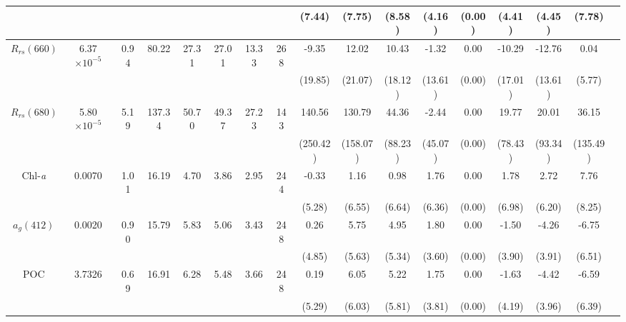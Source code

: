 \documentclass[preview]{standalone}
\begin{document}
\begin{tabular}{ccccccccccccccccc}
 				&						&		&			&			&			&			&			&   (7.44) 	&  (7.75) 	&  (8.58) 	&  (4.16) 	& (0.00) 	&  (4.41) 	&   (4.45) 	&   (7.78) 	\\ \hline   
$R_{rs}(660)$ 	& 6.37$\times10^{-5}$ 	& 0.94 	&  80.22 	&  27.31 	&	27.01 	&  13.33 	& 	268 	&   -9.35  	&  12.02   	&  10.43 	&  -1.32 	&  0.00   	& -10.29    &  -12.76  	&    0.04 	\\
 				&						&		&			&			&			&			&			&  (19.85) 	& (21.07) 	& (18.12) 	& (13.61) 	& (0.00) 	& (17.01) 	&  (13.61) 	&   (5.77) 	\\ \hline 
$R_{rs}(680)$ 	& 5.80$\times10^{-5}$ 	& 5.19 	& 137.34 	&  50.70 	&	49.37 	&  27.23 	& 	143 	&  140.56  	& 130.79  	&  44.36  	&  -2.44  	&  0.00   	&  19.77    &   20.01  	&   36.15 	\\
 				&						&		&			&			&			&			&			& (250.42) 	&(158.07) 	& (88.23) 	&  (45.07) 	& (0.00)	& (78.43) 	&  (93.34) 	& (135.49) 	\\ \hline
Chl-\it{a} 		&  0.0070             	& 1.01 	&  16.19    &    4.70 	&	 3.86 	&   2.95 	& 	244 	&   -0.33  	&   1.16  	&   0.98   	&   1.76  	&  0.00  	&   1.78  	&    2.72  	&    7.76  	\\
 				&						&		&			&			&			&			&			&   (5.28) 	&  (6.55) 	&  (6.64) 	&  (6.36) 	& (0.00) 	&  (6.98) 	&   (6.20) 	&   (8.25) 	\\ \hline
$a_{g}(412)$ 	&  0.0020             	& 0.90 	&  15.79    &    5.83 	&	 5.06 	&   3.43 	& 	248 	&    0.26  	&   5.75  	&   4.95  	&   1.80  	&  0.00  	&  -1.50  	&   -4.26  	&   -6.75  	\\
 				&						&		&			&			&			&			&			&   (4.85) 	&  (5.63) 	&  (5.34) 	&  (3.60) 	& (0.00) 	&  (3.90) 	&   (3.91) 	&   (6.51) 	\\ \hline
POC 			&  3.7326             	& 0.69 	&  16.91    &    6.28 	&	 5.48 	&   3.66 	& 	248 	&    0.19  	&   6.05  	&   5.22  	&   1.75  	&  0.00  	&  -1.63  	&   -4.42  	&   -6.59  	\\
 				&						&		&			&			&			&			&			&   (5.29) 	&  (6.03) 	&  (5.81) 	&  (3.81) 	& (0.00) 	&  (4.19) 	&   (3.96) 	&   (6.39) 	\\ \hline
 \end{tabular}
\end{document}
